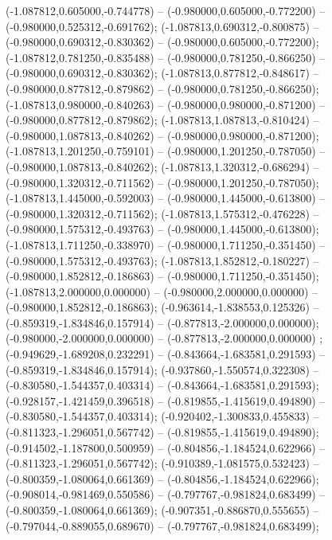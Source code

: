  (-1.087812,0.605000,-0.744778) -- (-0.980000,0.605000,-0.772200) -- (-0.980000,0.525312,-0.691762);
 (-1.087813,0.690312,-0.800875) -- (-0.980000,0.690312,-0.830362) -- (-0.980000,0.605000,-0.772200);
 (-1.087812,0.781250,-0.835488) -- (-0.980000,0.781250,-0.866250) -- (-0.980000,0.690312,-0.830362);
 (-1.087813,0.877812,-0.848617) -- (-0.980000,0.877812,-0.879862) -- (-0.980000,0.781250,-0.866250);
 (-1.087813,0.980000,-0.840263) -- (-0.980000,0.980000,-0.871200) -- (-0.980000,0.877812,-0.879862);
 (-1.087813,1.087813,-0.810424) -- (-0.980000,1.087813,-0.840262) -- (-0.980000,0.980000,-0.871200);
 (-1.087813,1.201250,-0.759101) -- (-0.980000,1.201250,-0.787050) -- (-0.980000,1.087813,-0.840262);
 (-1.087813,1.320312,-0.686294) -- (-0.980000,1.320312,-0.711562) -- (-0.980000,1.201250,-0.787050);
 (-1.087813,1.445000,-0.592003) -- (-0.980000,1.445000,-0.613800) -- (-0.980000,1.320312,-0.711562);
 (-1.087813,1.575312,-0.476228) -- (-0.980000,1.575312,-0.493763) -- (-0.980000,1.445000,-0.613800);
 (-1.087813,1.711250,-0.338970) -- (-0.980000,1.711250,-0.351450) -- (-0.980000,1.575312,-0.493763);
 (-1.087813,1.852812,-0.180227) -- (-0.980000,1.852812,-0.186863) -- (-0.980000,1.711250,-0.351450);
 (-1.087813,2.000000,0.000000) -- (-0.980000,2.000000,0.000000) -- (-0.980000,1.852812,-0.186863);
 (-0.963614,-1.838553,0.125326) -- (-0.859319,-1.834846,0.157914) -- (-0.877813,-2.000000,0.000000);
 (-0.980000,-2.000000,0.000000) -- (-0.877813,-2.000000,0.000000) ;
 (-0.949629,-1.689208,0.232291) -- (-0.843664,-1.683581,0.291593) -- (-0.859319,-1.834846,0.157914);
 (-0.937860,-1.550574,0.322308) -- (-0.830580,-1.544357,0.403314) -- (-0.843664,-1.683581,0.291593);
 (-0.928157,-1.421459,0.396518) -- (-0.819855,-1.415619,0.494890) -- (-0.830580,-1.544357,0.403314);
 (-0.920402,-1.300833,0.455833) -- (-0.811323,-1.296051,0.567742) -- (-0.819855,-1.415619,0.494890);
 (-0.914502,-1.187800,0.500959) -- (-0.804856,-1.184524,0.622966) -- (-0.811323,-1.296051,0.567742);
 (-0.910389,-1.081575,0.532423) -- (-0.800359,-1.080064,0.661369) -- (-0.804856,-1.184524,0.622966);
 (-0.908014,-0.981469,0.550586) -- (-0.797767,-0.981824,0.683499) -- (-0.800359,-1.080064,0.661369);
 (-0.907351,-0.886870,0.555655) -- (-0.797044,-0.889055,0.689670) -- (-0.797767,-0.981824,0.683499);
